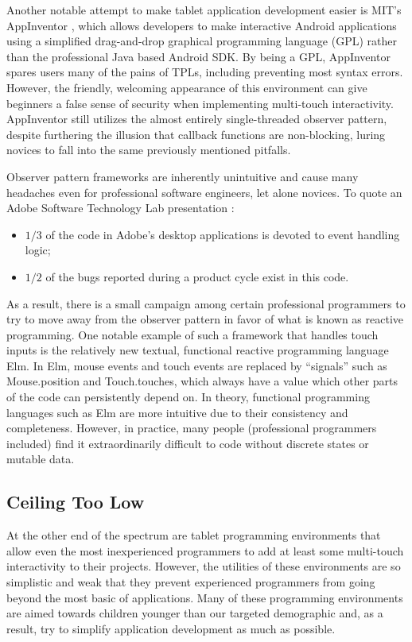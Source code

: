 Another notable attempt to make tablet application development easier is MIT's AppInventor \cite{AppInventor}, which allows developers to make interactive Android applications using a simplified drag-and-drop graphical programming language (GPL) rather than the professional Java based Android SDK. By being a GPL, AppInventor spares users many of the pains of TPLs, including preventing most syntax errors. However, the friendly, welcoming appearance of this environment can give beginners a false sense of security when implementing multi-touch interactivity. AppInventor still utilizes the almost entirely single-threaded observer pattern, despite furthering the illusion that callback functions are non-blocking, luring novices to fall into the same previously mentioned pitfalls.

Observer pattern frameworks are inherently unintuitive and cause many headaches even for professional software engineers, let alone novices. To quote an Adobe Software Technology Lab presentation \cite{Parent}:

\begin{itemize}
\item $1/3$ of the code in Adobe's desktop applications is devoted to event handling logic;
\item $1/2$ of the bugs reported during a product cycle exist in this code.
\end{itemize}

As a result, there is a small campaign among certain professional programmers to try to move away from the observer pattern in favor of what is known as reactive programming\cite{Maier, vanderPloeg}. One notable example of such a framework that handles touch inputs is the relatively new textual, functional reactive programming language Elm\cite{Elm}. In Elm, mouse events and touch events are replaced by ``signals'' such as Mouse.position and Touch.touches, which always have a value which other parts of the code can persistently depend on. In theory, functional programming languages such as Elm are more intuitive due to their consistency and completeness. However, in practice, many people (professional programmers included) find it extraordinarily difficult to code without discrete states or mutable data.

\subsection{Ceiling Too Low}
At the other end of the spectrum are tablet programming environments that allow even the most inexperienced programmers to add at least some multi-touch interactivity to their projects. However, the utilities of these environments are so simplistic and weak that they prevent experienced programmers from going beyond the most basic of applications. Many of these programming environments are aimed towards children younger than our targeted demographic and, as a result, try to simplify application development as much as possible. 

